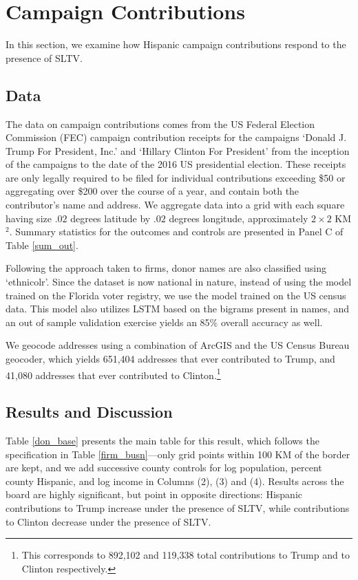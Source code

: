 \documentclass[11pt]{article}
\begin{document}
\section{Campaign Contributions}\label{seccamp}
In this section, we examine how Hispanic campaign contributions respond to the presence of SLTV.  

\subsection{Data}
The data on campaign contributions comes from the US Federal Election Commission (FEC) campaign contribution receipts for the campaigns `Donald J. Trump For President, Inc.' and `Hillary Clinton For President' from the inception of the campaigns to the date of the 2016 US presidential election. These receipts are only legally required to be filed for individual contributions exceeding \$50 or aggregating over \$200 over the course of a year, and contain both the contributor's name and address. We aggregate data into a grid with each square having size $.02$ degrees latitude by $.02$ degrees longitude, approximately $2 \times 2$ KM$^2$. Summary statistics for the outcomes and controls are presented in Panel C of Table \ref{sum_out}.

Following the approach taken to firms, donor names are also classified using `ethnicolr'. Since the dataset is now national in nature, instead of using the model trained on the Florida voter registry, we use the model trained on the US census data. This model also utilizes LSTM based on the bigrams present in names, and an out of sample validation exercise yields an 85\% overall accuracy as well.

We geocode addresses using a combination of ArcGIS and the US Census Bureau geocoder, which yields 651,404 addresses that ever contributed to Trump, and 41,080 addresses that ever contributed to Clinton.\footnote{ This corresponds to 892,102 and 119,338 total contributions to Trump and to Clinton respectively. } 

\subsection{Results and Discussion}
Table \ref{don_base} presents the main table for this result, which follows the specification in Table \ref{firm_busn}---only grid points within 100 KM of the border are kept, and we add successive county controls for log population, percent county Hispanic, and log income in Columns (2), (3) and (4). Results across the board are highly significant, but point in opposite directions: Hispanic contributions to Trump increase under the presence of SLTV, while contributions to Clinton decrease under the presence of SLTV.
\end{document}
